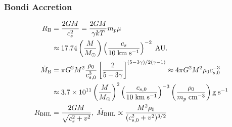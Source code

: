 \begin{multicols}{2}
\subsubsection*{Bondi Accretion}
\footnotesize
\[
\begin{aligned}
    R_{\rm B} &= \frac{2GM}{c_s^2} = \frac{2GM}{\gamma kT} m_p\mu\\
    &\approx 17.74 \left(\frac{M}{M_\odot}\right) \left(\frac{c_s}{10\;{\rm km\;s^{-1}}}\right)^{-2}\;{\rm AU}.\\
    \dot{M}_{\rm B} &= \pi G^2M^2 \frac{\rho_0}{c_{s,0}^3}\left[\frac{2}{5-3\gamma}\right]^{(5-3\gamma)/2(\gamma-1)}\approx 4\pi G^2M^2 \rho_0c_{s,0}^{-3}\\
    &\approx 3.7\times10^{11} \left(\frac{M}{M_\odot}\right)^2 \left(\frac{c_{s,0}}{10\;{\rm km\;s^{-1}}}\right)^{-3} \left(\frac{\rho_0}{m_p\;{\rm cm^{-3}}}\right) {\rm g\;s^{-1}}\\
    R_{\rm BHL} &= \frac{2GM}{\sqrt{c_s^2+v^2}},\;\dot{M}_{\rm BHL} \propto \frac{M^2 \rho_0}{(c_{s,0}^2+v^2)^{3/2}}
\end{aligned}
\]

\end{multicols}
